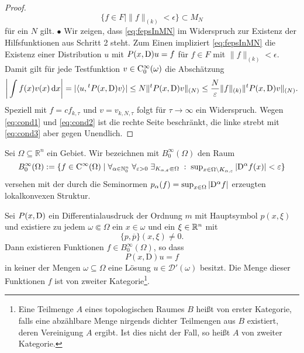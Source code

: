 \begin{proof}
\begin{equation}\label{eq:fepsInMN}
    \{ f\in F\mid \|f\|_{(k)}<\epsilon\} \subset M_N
\end{equation}
für ein $N$ gilt. $\bullet$  Wir zeigen, dass \eqref{eq:fepsInMN} im Widerspruch zur Existenz der Hilfsfunktionen aus Schritt 2 steht. 
Zum Einen impliziert \eqref{eq:fepsInMN} die Existenz einer Distribution $u$ mit $P(x,\mathrm D)u=f$ für $f\in F$ mit $\|f\|_{(k)}<\epsilon$. Damit gilt für jede Testfunktion $v\in\mathrm C_0^\infty(\omega)$ die Abschätzung
\begin{equation}
   \bigg| \int f(x) v(x) \,\mathrm d x\bigg| = |\langle u, {}^t P(x,\mathrm D) v \rangle| \le N \| {}^t P(x,\mathrm D) v\|_{(N)} \le \frac N{\varepsilon} \|f\|_{(k)} \|{}^tP(x,\mathrm D) v\|_{(N)}.
\end{equation}
Speziell mit $f=c f_{k,\tau}$ und $v=v_{k,N,\tau}$ folgt für $\tau\to\infty$ ein Widerspruch. Wegen \eqref{eq:cond1} und \eqref{eq:cond2} ist die rechte Seite beschränkt, die linke strebt mit \eqref{eq:cond3} aber gegen Unendlich.
\end{proof}

\begin{df}
Sei $\Omega\subseteq\mathbb{R}^n$ ein Gebiet. Wir bezeichnen mit $B_0^\infty(\Omega)$ den Raum 
\begin{equation}
B_0^\infty(\Omega) :=\{f\in \mathrm C^\infty(\Omega) \mid \forall_{\alpha\in\mathbb N_0^n}\;\forall_{\varepsilon >0} \;\exists_{K_{\alpha,\varepsilon}\Subset\Omega} \;:\; \sup\nolimits_{x\in \Omega\setminus K_{\alpha,\varepsilon}}|\mathrm D^\alpha f(x)|<\varepsilon \}
\end{equation}
versehen mit der durch die Seminormen $p_\alpha(f)=\sup_{x\in\Omega} |\mathrm D^\alpha f|$ erzeugten lokalkonvexen Struktur.
\end{df}



\begin{thm}\label{thm:2_hoer}
Sei $P(x,\mathrm D)$ ein Differentialausdruck der Ordnung $m$ mit  Hauptsymbol $p(x,\xi)$ und existiere zu jedem $\omega\Subset\Omega$ 
ein $x\in\omega$ und ein $\xi\in\mathbb R^n$ mit
\begin{equation}
 \{p,\overline p\}(x,\xi)\ne 0.
\end{equation}
Dann existieren Funktionen $f\in B_0^\infty(\Omega)$, so dass
\begin{equation}\label{lewy:pxDu=f}
P(x,\mathrm D)u=f
\end{equation}
in keiner der Mengen $\omega\subseteq\Omega$ eine Lösung $u\in\mathscr D'(\omega)$ besitzt. Die Menge dieser Funktionen $f$ ist von zweiter Kategorie\footnote{Eine Teilmenge $A$ eines topologischen Raumes $B$ heißt von erster Kategorie, falls eine abzählbare Menge nirgends dichter Teilmengen aus $B$ existiert, deren Vereinigung $A$ ergibt. Ist dies nicht der Fall, so heißt $A$ von zweiter Kategorie.}.
\end{thm}

